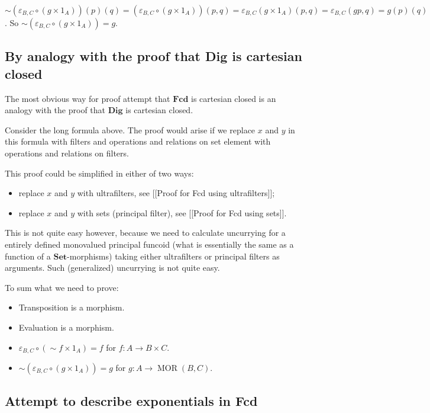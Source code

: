   $\sim ( \varepsilon_{B, C} \circ ( g \times 1_{A})) ( p) ( q) = ( \varepsilon_{B, C} \circ ( g \times 1_{A})) ( p , q) = \varepsilon_{B, C} ( g \times 1_{A}) ( p , q) = \varepsilon_{B, C} ( g p , q) = g ( p) ( q)$. So $\sim ( \varepsilon_{B, C} \circ ( g \times 1_{A})) = g$.

\subsection{By analogy with the proof that Dig is cartesian closed}

The most obvious way for proof attempt that $\mathbf{Fcd}$ is cartesian closed is an analogy with the proof that
$\mathbf{Dig}$ is cartesian closed.

Consider the long formula above. The proof would arise if we replace $x$ and $y$ in this formula with filters and operations and relations on set element with operations and relations on filters.

This proof could be simplified in either of two ways:
\begin{itemize}
\item replace $x$ and $y$ with ultrafilters, see [[Proof for Fcd using ultrafilters]];
\item replace $x$ and $y$ with sets (principal filter), see [[Proof for Fcd using sets]].
\end{itemize}

This is not quite easy however, because we need to calculate uncurrying for a entirely defined monovalued principal funcoid (what is essentially the same as a function of a $\mathbf{Set}$-morphisms) taking either ultrafilters or principal filters as arguments. Such (generalized) uncurrying is not quite easy.

To sum what we need to prove:
\begin{itemize}
\item Transposition is a morphism.
\item Evaluation is a morphism.
\item $\varepsilon_{B,C} \circ ( \sim f \times 1_A) = f$ for $f : A \rightarrow B \times C$.
\item $\sim ( \varepsilon_{B,C} \circ ( g \times 1_A)) = g$ for $g : A \rightarrow \operatorname{MOR} ( B , C)$.
\end{itemize}

\subsection{Attempt to describe exponentials in Fcd}

